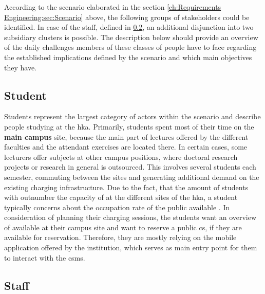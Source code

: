 According to the scenario elaborated in the section \ref{ch:Requirements Engineering:sec:Scenario} above, the following groups of stakeholders could be identified. 
In case of the staff, defined in \ref{ch:Requirements Engineering:sec:Stakeholders:ssec:Staff}, an additional disjunction into two subsidiary clusters is possible. 
The description below should provide an overview of the daily challenges members of these classes of people have to face regarding the established implications defined by the scenario and which main objectives they have. 

\subsection{Student}
\label{ch:Requirements Engineering:sec:Stakeholders:ssec:Student}

Students represent the largest category of actors within the scenario and describe people studying at the \acrshort{hka}. Primarily, students spent most of their time on the \textbf{main campus} site, because the main part of lectures offered by the different faculties and the attendant exercises are located there.
In certain cases, some lecturers offer subjects at other campus positions, where doctoral research projects or research in general is outsourced. This involves several students each semester, commuting between the sites and generating additional demand on the existing charging infrastructure.
Due to the fact, that the amount of students with  outnumber the capacity of  at the different sites of the \acrshort{hka}, a student typically concerns about the occupation rate of the public available .
In consideration of planning their charging sessions, the students want an overview of available  at their campus site and want to reserve a public \acrshort{cs}, if they are available for reservation.
Therefore, they are mostly relying on the mobile application offered by the institution, which serves as main entry point for them to interact with the \acrshort{csms}. 

\subsection{Staff}
\label{ch:Requirements Engineering:sec:Stakeholders:ssec:Staff}

